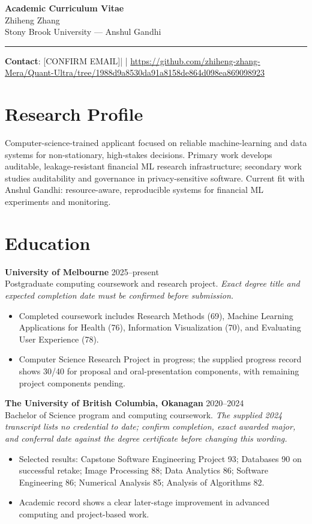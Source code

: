 \documentclass[11pt]{article}
\newcommand{\ApplicantName}{Zhiheng Zhang}
\newcommand{\ApplicantEmail}{[CONFIRM EMAIL]}
\newcommand{\ApplicantPhone}{[CONFIRM PHONE]}
\newcommand{\ApplicantGitHub}{\url{https://github.com/zhiheng-zhang-Mera/Quant-Ultra/tree/1988d9a8530da91a8158de864d098ea869098923}}
\begin{document}
\begin{center}
{\LARGE\bfseries Academic Curriculum Vitae}\\[0.25em]
{\large \ApplicantName}\\
Stony Brook University --- Anshul Gandhi
\end{center}
\vspace{0.35em}\hrule\vspace{0.65em}

\textbf{Contact}: \ApplicantEmail\quad | \quad \ApplicantPhone\quad | \quad \ApplicantGitHub

\section*{Research Profile}
Computer-science-trained applicant focused on reliable machine-learning and data systems for non-stationary, high-stakes decisions. Primary work develops auditable, leakage-resistant financial ML research infrastructure; secondary work studies auditability and governance in privacy-sensitive software. Current fit with Anshul Gandhi: resource-aware, reproducible systems for financial ML experiments and monitoring.

\section*{Education}
\textbf{University of Melbourne} \hfill 2025--present\\
Postgraduate computing coursework and research project. \textit{Exact degree title and expected completion date must be confirmed before submission.}
\begin{itemize}
\item Completed coursework includes Research Methods (69), Machine Learning Applications for Health (76), Information Visualization (70), and Evaluating User Experience (78).
\item Computer Science Research Project in progress; the supplied progress record shows 30/40 for proposal and oral-presentation components, with remaining project components pending.
\end{itemize}

\textbf{The University of British Columbia, Okanagan} \hfill 2020--2024\\
Bachelor of Science program and computing coursework. \textit{The supplied 2024 transcript lists no credential to date; confirm completion, exact awarded major, and conferral date against the degree certificate before changing this wording.}
\begin{itemize}
\item Selected results: Capstone Software Engineering Project 93; Databases 90 on successful retake; Image Processing 88; Data Analytics 86; Software Engineering 86; Numerical Analysis 85; Analysis of Algorithms 82.
\item Academic record shows a clear later-stage improvement in advanced computing and project-based work.
\end{itemize}
\end{document}
